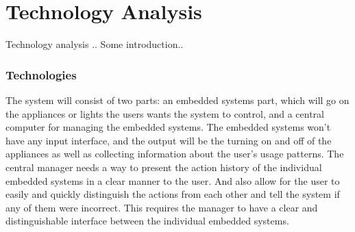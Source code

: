 \chapter{Technology Analysis}
\label{chap:Technology Analysis}
Technology analysis    .. Some introduction..
\subsection{Technologies}
\label{sub:Technologies}
The system will consist of two parts: an embedded systems part, which will go on
the appliances or lights the users wants the system to control, and a central
computer for managing the embedded systems. The embedded systems won't have any
input interface, and the output will be the turning on and off of the appliances
as well as collecting information about the user's usage patterns.
The central manager needs a way to present the action history of the individual embedded systems in a clear manner to the user.
And also allow for the user to easily and quickly distinguish the actions from each other and tell the system if any of them were incorrect.
This requires the manager to have a clear and distinguishable interface between the individual embedded systems.

